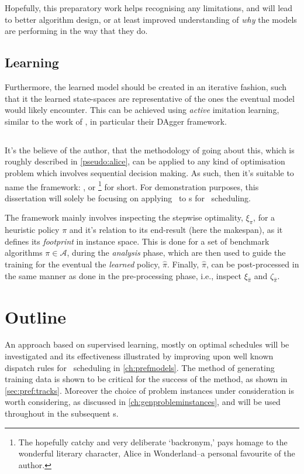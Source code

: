 Hopefully, this preparatory work helps recognising any limitations, and will 
lead to better algorithm design, or at least improved understanding of 
\emph{why} the models are performing in the way that they do.

\subsection*{Learning}
Furthermore, the learned model should be created in an iterative fashion, such 
that it the learned state-spaces are representative of the ones the eventual 
model would likely encounter. This can be achieved using \emph{active} 
imitation learning, similar to the work of \cite{RossB10,RossGB11}, in 
particular their DAgger framework. 

\subsection*{\Alice}
It's the believe of the author, that the methodology of going about this, which 
is roughly described in \cref{pseudo:alice}, can be applied to any kind of 
optimisation problem which involves sequential decision making. 
As such, then it's suitable to name the framework:
\emph{\fullnameAlice}, or \Alice\footnote{
    The hopefully catchy and very deliberate `backronym,' pays homage to 
    the wonderful literary character, Alice in Wonderland--a personal 
    favourite of the author.} 
for short. 
For demonstration purposes, this dissertation will solely be 
focusing on applying \Alice\ to \dr s for \jsp\ scheduling.



The framework mainly involves inspecting the stepwise optimality, $\xi_\pi$, 
for a heuristic policy $\pi$ and it's relation to its end-result (here the 
makespan), as it defines its \emph{footprint} in instance space.
This is done for a set of benchmark algorithms $\pi\in\mathcal{A}$, during the 
\emph{analysis} phase, which are then used to guide the training 
for the eventual the \emph{learned} policy, $\hat{\pi}$. 
Finally, $\hat{\pi}$, can be post-processed in the same manner as done in the 
pre-processing phase, i.e., inspect $\xi_{\hat{\pi}}$ and $\zeta_{\hat{\pi}}$.

\section{Outline}
An approach based on supervised learning, mostly on optimal schedules will be 
investigated and its effectiveness illustrated by improving upon well known 
dispatch rules for \jsp\ scheduling in \cref{ch:prefmodels}. The method of 
generating training data is shown to be critical for the success of the method, 
as shown in \cref{sec:pref:tracks}. Moreover the choice of problem 
instances under consideration is worth considering, as discussed in 
\cref{ch:genprobleminstances}, and will be used throughout in the subsequent 
s. 

